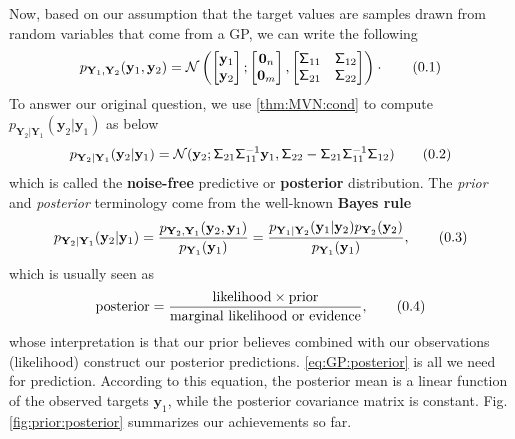 \documentclass[10pt]{article}
\theoremstyle{definition}
\newcommand\eqnum{\addtocounter{equation}{1}\tag{\arabic{section}.\arabic{equation}}}
\begin{document}
Now, based on our assumption that the target values are samples drawn from random variables that come from a GP, we can write the following
\begin{equation*}
p_{\mathbf{Y}_{1}, \mathbf{Y}_{2}}(\mathbf{y}_{1}, \mathbf{y}_{2}) =
\mathcal{N} \left(
\begin{bmatrix}
\mathbf{y}_1 \\
\mathbf{y}_2
\end{bmatrix} ;
\begin{bmatrix}
\mathbf{0}_n \\
\mathbf{0}_m
\end{bmatrix} ,
\begin{bmatrix}
\mathsf{\Sigma}_{11} & \mathsf{\Sigma}_{12} \\
\mathsf{\Sigma}_{21} & \mathsf{\Sigma}_{22} 
\end{bmatrix}
\right) \cdot
\eqnum
\label{eq:GP:joint}
\end{equation*}
To answer our original question, we use \cref{thm:MVN:cond} to compute $p_{\mathbf{Y}_2|\mathbf{Y}_1}(\mathbf{y}_2|\mathbf{y}_1)$ as below
\begin{equation*}
p_{\mathbf{Y}_2|\mathbf{Y}_1}(\mathbf{y}_2|\mathbf{y}_1) = 
\mathcal{N}(\mathbf{y}_2;\mathsf{\Sigma}_{21}\mathsf{\Sigma}_{11}^{-1}\mathbf{y}_1, \mathsf{\Sigma}_{22} - 
\mathsf{\Sigma}_{21} \mathsf{\Sigma}_{11}^{-1} \mathsf{\Sigma}_{12})
\eqnum
\label{eq:GP:posterior}
\end{equation*}
which is called the \textbf{noise-free} predictive or \textbf{posterior} distribution.  The \textit{prior} and \textit{posterior} terminology come from the well-known \textbf{Bayes rule}
\begin{equation*}
p_{\mathbf{Y}_2|\mathbf{Y}_1}(\mathbf{y}_2|\mathbf{y}_1) =
\frac{p_{\mathbf{Y}_2,\mathbf{Y}_1}(\mathbf{y}_2,\mathbf{y}_1)}{p_{\mathbf{Y}_1}(\mathbf{y}_1)} = 
\frac{p_{\mathbf{Y}_1|\mathbf{Y}_2}(\mathbf{y}_1|\mathbf{y}_2)p_{\mathbf{Y}_2}(\mathbf{y}_2)}{p_{\mathbf{Y}_1}(\mathbf{y}_1)},
\eqnum
\end{equation*}
which is usually seen as
\begin{equation*}
\text{posterior} = \frac{\text{likelihood} \times \text{prior}}{\text{marginal likelihood or evidence}},
\eqnum
\end{equation*}
whose interpretation is that our prior believes combined with our observations (likelihood) construct our posterior predictions. \cref{eq:GP:posterior} is all we need for prediction. According to this equation, the posterior mean is a linear function of the observed targets $\mathbf{y}_1$, while the posterior covariance matrix is constant. Fig. \ref{fig:prior:posterior} summarizes our achievements so far.
\end{document}
